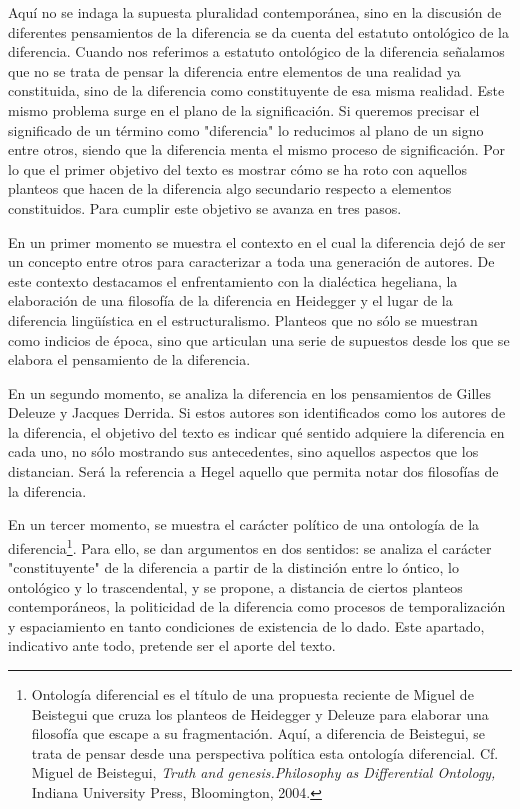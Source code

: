 \documentclass{book}
\begin{document}
Aquí no se indaga la supuesta pluralidad contemporánea, sino en la
discusión de diferentes pensamientos de la diferencia se da cuenta del
estatuto ontológico de la diferencia. Cuando nos referimos a estatuto
ontológico de la diferencia señalamos que no se trata de pensar la
diferencia entre elementos de una realidad ya constituida, sino de la
diferencia como constituyente de esa misma realidad. Este mismo problema
surge en el plano de la significación. Si queremos precisar el
significado de un término como "diferencia" lo reducimos al plano de un
signo entre otros, siendo que la diferencia menta el mismo proceso de
significación. Por lo que el primer objetivo del texto es mostrar cómo
se ha roto con aquellos planteos que hacen de la diferencia algo
secundario respecto a elementos constituidos. Para cumplir este objetivo
se avanza en tres pasos.

En un primer momento se muestra el contexto en el cual la diferencia
dejó de ser un concepto entre otros para caracterizar a toda una
generación de autores. De este contexto destacamos el enfrentamiento con
la dialéctica hegeliana, la elaboración de una filosofía de la
diferencia en Heidegger y el lugar de la diferencia lingüística en el
estructuralismo. Planteos que no sólo se muestran como indicios de
época, sino que articulan una serie de supuestos desde los que se
elabora el pensamiento de la diferencia.

En un segundo momento, se analiza la diferencia en los pensamientos de
Gilles Deleuze y Jacques Derrida. Si estos autores son identificados
como los autores de la diferencia, el objetivo del texto es indicar qué
sentido adquiere la diferencia en cada uno, no sólo mostrando sus
antecedentes, sino aquellos aspectos que los distancian. Será la
referencia a Hegel aquello que permita notar dos filosofías de la
diferencia.

En un tercer momento, se muestra el carácter político de una ontología
de la diferencia\footnote{Ontología diferencial es el título de una
  propuesta reciente de Miguel de Beistegui que cruza los planteos de
  Heidegger y Deleuze para elaborar una filosofía que escape a su
  fragmentación. Aquí, a diferencia de Beistegui, se trata de pensar
  desde una perspectiva política esta ontología diferencial. Cf. Miguel
  de Beistegui, \emph{Truth and genesis.Philosophy as Differential
  Ontology,} Indiana University Press, Bloomington, 2004.}. Para ello,
se dan argumentos en dos sentidos: se analiza el carácter
"constituyente" de la diferencia a partir de la distinción entre lo
óntico, lo ontológico y lo trascendental, y se propone, a distancia de
ciertos planteos contemporáneos, la politicidad de la diferencia como
procesos de temporalización y espaciamiento en tanto condiciones de
existencia de lo dado. Este apartado, indicativo ante todo, pretende ser
el aporte del texto.
\end{document}
